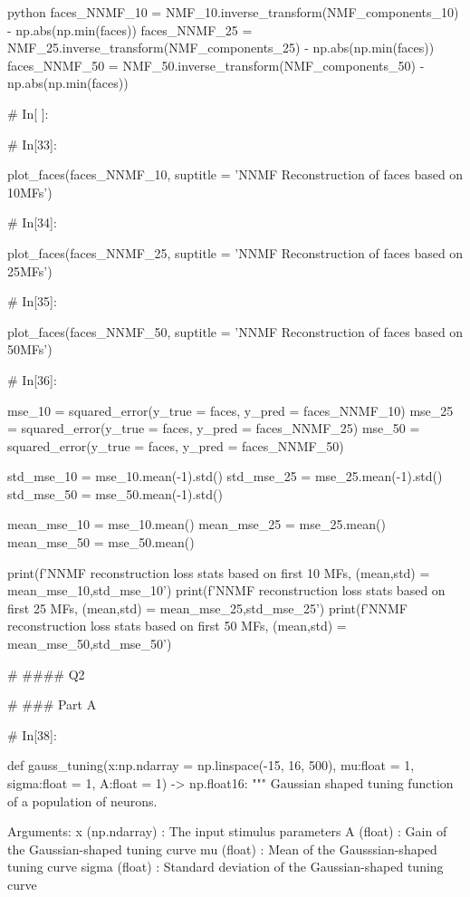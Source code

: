\documentclass[12pt]{amsart}
\begin{document}
\begin{mintedbox}{python}
faces_NNMF_10 = NMF_10.inverse_transform(NMF_components_10) - np.abs(np.min(faces))
faces_NNMF_25 = NMF_25.inverse_transform(NMF_components_25) - np.abs(np.min(faces))
faces_NNMF_50 = NMF_50.inverse_transform(NMF_components_50) - np.abs(np.min(faces))


# In[ ]:





# In[33]:


plot_faces(faces_NNMF_10, suptitle = 'NNMF Reconstruction of faces based on 10MFs')


# In[34]:


plot_faces(faces_NNMF_25, suptitle = 'NNMF Reconstruction of faces based on 25MFs')


# In[35]:


plot_faces(faces_NNMF_50, suptitle = 'NNMF Reconstruction of faces based on 50MFs')


# In[36]:


mse_10 = squared_error(y_true = faces, y_pred = faces_NNMF_10)
mse_25 = squared_error(y_true = faces, y_pred = faces_NNMF_25)
mse_50 = squared_error(y_true = faces, y_pred = faces_NNMF_50)


std_mse_10 = mse_10.mean(-1).std()
std_mse_25 = mse_25.mean(-1).std()
std_mse_50 = mse_50.mean(-1).std()

mean_mse_10 = mse_10.mean()
mean_mse_25 = mse_25.mean()
mean_mse_50 = mse_50.mean()


print(f'NNMF reconstruction loss stats based on first 10 MFs, \n (mean,std) = {mean_mse_10,std_mse_10}')
print(f'NNMF reconstruction loss stats based on first 25 MFs, \n (mean,std) = {mean_mse_25,std_mse_25}')
print(f'NNMF reconstruction loss stats based on first 50 MFs, \n (mean,std) = {mean_mse_50,std_mse_50}')


# #### Q2

# ### Part A

# In[38]:


def gauss_tuning(x:np.ndarray = np.linspace(-15, 16, 500),
                 mu:float = 1,
                 sigma:float = 1,
                 A:float = 1) -> np.float16:
    """
        Gaussian shaped tuning function of a population of neurons.

        Arguments:
            x     (np.ndarray)   : The input stimulus parameters
            A     (float)        : Gain of the Gaussian-shaped tuning curve
            mu    (float)   : Mean of the Gausssian-shaped tuning curve
            sigma (float)        : Standard deviation of the Gaussian-shaped tuning curve


\end{mintedbox}
\end{document}
